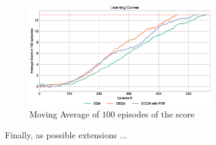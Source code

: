 \documentclass[a4paper]{article}
\begin{document}
\begin{figure}[ht]
\centering
\includegraphics[width=0.7\textwidth]{../notebooks/figures/2018-08-23-final-comparition-2.eps}
\caption{Moving Average of $100$ episodes of the score}
\label{fig:final_comp}
\end{figure}


Finally, as possible extensions ...








\end{document}
